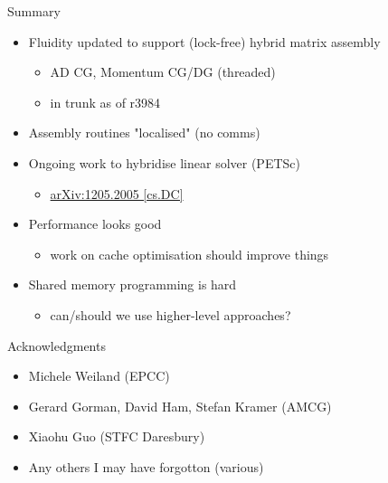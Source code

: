 \documentclass[bigger]{beamer}
\begin{document}
\begin{frame}[label={sec:orgheadline37}]{Summary}
\begin{itemize}
\item Fluidity updated to support (lock-free) hybrid matrix assembly
\begin{itemize}
\item AD CG, Momentum CG/DG (threaded)
\item in trunk as of r3984
\end{itemize}
\item Assembly routines "localised" (no comms)
\item Ongoing work to hybridise linear solver (PETSc)
\begin{itemize}
\item \href{http://arxiv.org/abs/1205.2005}{arXiv:1205.2005 [cs.DC]}
\end{itemize}
\item Performance looks good
\begin{itemize}
\item work on cache optimisation should improve things
\end{itemize}
\item Shared memory programming is hard
\begin{itemize}
\item can/should we use higher-level approaches?
\end{itemize}
\end{itemize}
\end{frame}

\begin{frame}[label={sec:orgheadline38}]{Acknowledgments}
\begin{itemize}
\item Michele Weiland (EPCC)
\item Gerard Gorman, David Ham, Stefan Kramer (AMCG)
\item Xiaohu Guo (STFC Daresbury)
\item Any others I may have forgotton (various)
\end{itemize}
\end{frame}
\end{document}

